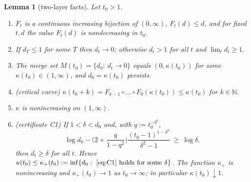 \documentclass[11pt]{article}
\newtheorem{lemma}[theorem]{Lemma}
\theoremstyle{definition}
\theoremstyle{remark}
\newcommand{\N}{\mathbb{N}}
\begin{document}
\begin{lemma}[two-layer facts]\label{lem:two-layer}
Let $t_0>1$.
\begin{enumerate}[label=(\alph*)]
\item $F_t$ is a continuous increasing bijection of $(0,\infty)$, $F_t(d)\le d$, and for fixed
$t,d$ the value $F_t(d)$ is nondecreasing in $t_0$.
\item If $d_T\le1$ for some $T$ then $d_t\to0$; otherwise $d_t>1$ for all $t$ and $\lim_t d_t\ge1$.
\item The merge set $M(t_0)=\{d_0:\ d_t\to0\}$ equals $(0,\kappa(t_0))$ for some
$\kappa(t_0)\in(1,\infty)$, and $d_0=\kappa(t_0)$ persists.
\item (critical curve) $\kappa(t_0+k)=F_{k-1}\circ\dots\circ F_0(\kappa(t_0))\le\kappa(t_0)$ for $k\in\N$.
\item $\kappa$ is nonincreasing on $(1,\infty)$.
\item (certificate C1) If $1<\delta<d_0$ and, with $q:=t_0^{-\delta^2}$,
\begin{equation}\label{eq:C1}
\log d_0-\Big(2+\frac{q}{1-q^2}\Big)\frac{(t_0-1)^{1-\delta^2}}{\delta^2-1}\ \ge\ \log\delta ,
\end{equation}
then $d_t\ge\delta$ for all $t$. Hence $\kappa(t_0)\le\kappa_+(t_0):=\inf\{d_0:\ \eqref{eq:C1}\text{ holds for some }\delta\}$.
The function $\kappa_+$ is nonincreasing and $\kappa_+(t_0)\to1$ as $t_0\to\infty$; in particular $\kappa(t_0)\downarrow1$.
\end{enumerate}
\end{lemma}
\end{document}
